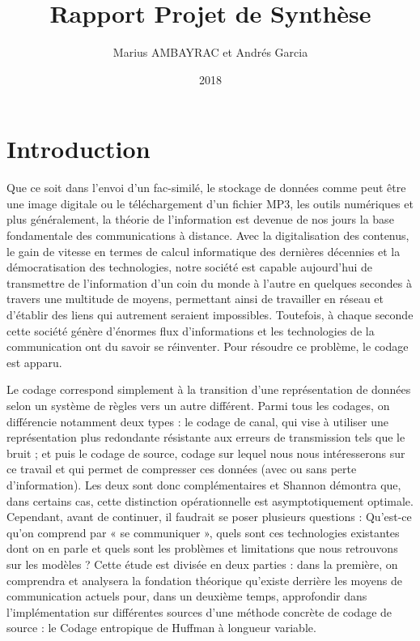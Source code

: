 \documentclass[a4paper,12pt,french]{article}
\begin{document}
\title{Rapport Projet de Synthèse}
\author{Marius AMBAYRAC et Andrés Garcia}
\date{2018}
\maketitle
\clearpage
\tableofcontents
\clearpage

\section{Introduction}

Que ce soit dans l’envoi d’un fac-similé, le stockage de données comme peut être une image digitale ou le téléchargement d’un fichier MP3, les outils numériques et plus généralement, la théorie de l’information est devenue de nos jours la base fondamentale des communications à distance. Avec la digitalisation des contenus, le gain de vitesse en termes de calcul informatique des dernières décennies et la démocratisation des technologies, notre société est capable aujourd’hui de transmettre de l’information d’un coin du monde à l’autre en quelques secondes à travers une multitude de moyens, permettant ainsi de travailler en réseau et d’établir des liens qui autrement seraient impossibles. Toutefois, à chaque seconde cette société génère d’énormes flux d’informations et les technologies de la communication ont du savoir se réinventer. Pour résoudre ce problème, le codage est apparu.

Le codage correspond simplement à la transition d’une représentation de données selon un système de règles vers un autre différent. Parmi tous les codages, on différencie notamment deux types : le codage de canal, qui vise à utiliser une représentation plus redondante résistante aux erreurs de transmission tels que le bruit ; et puis le codage de source, codage sur lequel nous nous intéresserons sur ce travail et qui permet de compresser ces données (avec ou sans perte d’information). Les deux sont donc complémentaires et Shannon démontra que, dans certains cas, cette distinction opérationnelle est asymptotiquement optimale. Cependant, avant de continuer, il faudrait se poser plusieurs questions : Qu’est-ce qu’on comprend par « se communiquer », quels sont ces technologies existantes dont on en parle et quels sont les problèmes et limitations que nous retrouvons sur les modèles ?
Cette étude est divisée en deux parties : dans la première, on comprendra et analysera la fondation théorique qu’existe derrière les moyens de communication actuels pour, dans un deuxième temps, approfondir dans l’implémentation sur différentes sources d’une méthode concrète de codage de source : le Codage entropique de Huffman à longueur variable.
\end{document}
